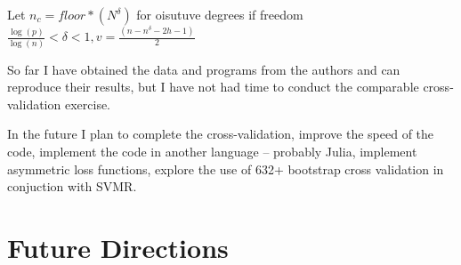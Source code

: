 \documentclass[12pt]{article}
\begin{document}
Let $n_c= floor*(N^\delta)$ for oisutuve degrees if freedom $\frac{\log(p)}{\log(n)}<\delta<1, v=\frac{(n-n^\delta-2h-1)}{2}$


So far  I have
 obtained the data and programs from the authors and can reproduce 
their results, but I have not had 
time to conduct the comparable cross-validation exercise.

In the future I plan to complete the cross-validation,
improve the speed of the code,
implement the code in another language -- probably Julia,
implement asymmetric loss functions,
explore the use of 632+ bootstrap cross validation in conjuction with 
SVMR.


\section{Future Directions}
\label{sec:future-directions}

\cite{journals/ijon/Cao03,conf/icml/TaiebH14}




\end{document}
